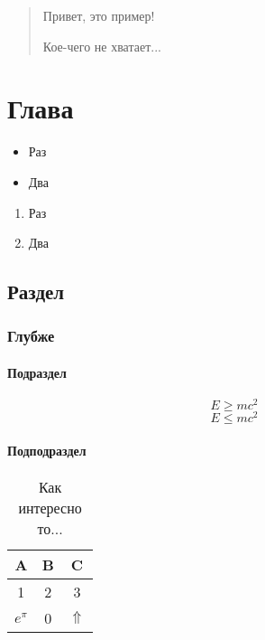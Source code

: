 \documentclass[12pt, rusmathsym]{nirreport}
\begin{document}
\titlepage

\begin{abstract}
  Привет, это пример!

  Кое-чего не хватает...
\end{abstract}

\tableofcontents

\chapter{Глава}

\begin{itemize}
\item Раз
\item Два
\end{itemize}

\begin{enumerate}
\item Раз
\item Два
\end{enumerate}

\lipsum[1]

\section{Раздел}

\lipsum[1]

\subsection{Глубже}

\lipsum[1]

\subsubsection{Подраздел}

\lipsum[1]
\begin{equation}
  E \geq mc^2
\end{equation}
\begin{equation}
  E \leq mc^2
\end{equation}
\lipsum[1]

\subsubsection{Подподраздел}

\lipsum[1]

\begin{table}[ht]
  \caption{Как интересно то...}
  \centering
  \begin{tabular}{ccc} \hline
    A           & B & C            \\ \hline
    1           & 2 & 3            \\
    \(e^{\pi}\) & 0 & \(\Uparrow\) \\ \hline
  \end{tabular}
\end{table}
\end{document}
